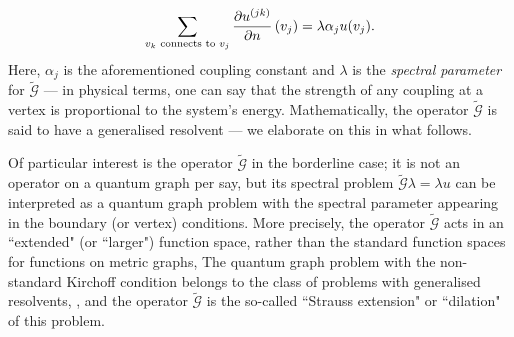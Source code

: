 \begin{itemize}
	\begin{align*}
	\sum_{v_k \text{ connects to } v_j} 
	\dfrac{\partial u^{(jk)}}{\partial n}\left( v_j \right) = \lambda\alpha_j u(v_j).
	\end{align*}
	Here, $\alpha_j$ is the aforementioned coupling constant and $\lambda$ is the \emph{spectral parameter} for $\tilde{\mathcal{G}}$ --- in physical terms, one can say that the strength of any coupling at a vertex is proportional to the system's energy.
	Mathematically, the operator $\tilde{\mathcal{G}}$ is said to have a generalised resolvent --- we elaborate on this in what follows.
\end{itemize}
Of particular interest is the operator $\tilde{\mathcal{G}}$ in the borderline case; it is not an operator on a quantum graph per say, but its spectral problem $\tilde{\mathcal{G}}\lambda = \lambda u$ can be interpreted as a quantum graph problem with the spectral parameter appearing in the boundary (or vertex) conditions.
More precisely, the operator $\tilde{\mathcal{G}}$ acts in an ``extended" (or ``larger") function space, rather than the standard function spaces for functions on metric graphs, 
The quantum graph problem with the non-standard Kirchoff condition belongs to the class of problems with generalised resolvents, , and the operator $\tilde{\mathcal{G}}$ is the so-called ``Strauss extension" or ``dilation" of this problem.

